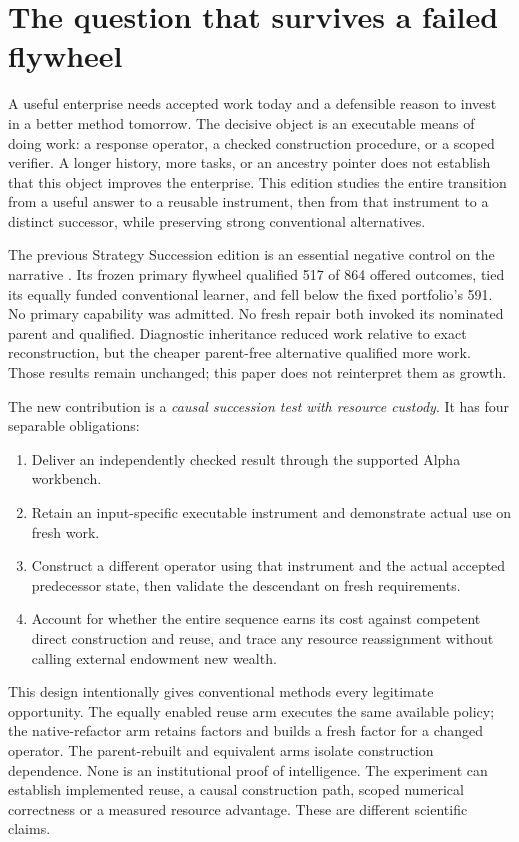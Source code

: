 \section{The question that survives a failed flywheel}
\label{sec:contribution}

A useful enterprise needs accepted work today and a defensible reason to invest in a better method tomorrow.
The decisive object is an executable means of doing work: a response operator, a checked construction procedure,
or a scoped verifier. A longer history, more tasks, or an ancestry pointer does not establish that this object
improves the enterprise. This edition studies the entire transition from a useful answer to a reusable instrument,
then from that instrument to a distinct successor, while preserving strong conventional alternatives.

The previous Strategy Succession edition is an essential negative control on the narrative
\citep{priorStrategy}. Its frozen primary flywheel qualified 517 of 864 offered outcomes, tied its equally
funded conventional learner, and fell below the fixed portfolio's 591. No primary capability was admitted.
No fresh repair both invoked its nominated parent and qualified. Diagnostic inheritance reduced work relative
to exact reconstruction, but the cheaper parent-free alternative qualified more work. Those results remain unchanged;
this paper does not reinterpret them as growth.

The new contribution is a \emph{causal succession test with resource custody}. It has four separable obligations:

\begin{enumerate}
\item Deliver an independently checked result through the supported Alpha workbench.
\item Retain an input-specific executable instrument and demonstrate actual use on fresh work.
\item Construct a different operator using that instrument and the actual accepted predecessor state, then
      validate the descendant on fresh requirements.
\item Account for whether the entire sequence earns its cost against competent direct construction and reuse,
      and trace any resource reassignment without calling external endowment new wealth.
\end{enumerate}

This design intentionally gives conventional methods every legitimate opportunity. The equally enabled reuse
arm executes the same available policy; the native-refactor arm retains factors and builds a fresh factor for a
changed operator. The parent-rebuilt and equivalent arms isolate construction dependence. None is an institutional
proof of intelligence. The experiment can establish implemented reuse, a causal construction path, scoped numerical
correctness or a measured resource advantage. These are different scientific claims.

